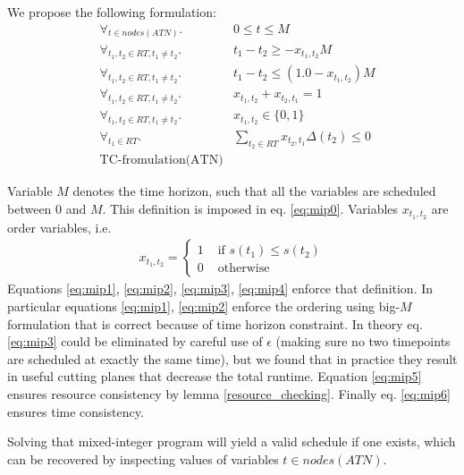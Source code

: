 \documentclass{article}
\begin{document}
\begin{multicols}{2}
We propose the following formulation:
\begin{align}
\label{eq:mip0} & \forall_{t \in nodes(ATN)}.              & 0 \leq t \leq M \\
\label{eq:mip1} & \forall_{t_1, t_2 \in RT, t_1 \neq t_2}. & t_1 - t_2 \geq - x_{t_1,t_2} M \\
\label{eq:mip2} & \forall_{t_1, t_2 \in RT, t_1 \neq t_2}. & t_1 - t_2 \leq (1.0 - x_{t_1,t_2}) M\\
\label{eq:mip3} & \forall_{t_1, t_2 \in RT, t_1 \neq t_2}. & x_{t_1,t_2} + x_{t_2,t_1}  = 1\\
\label{eq:mip4} & \forall_{t_1, t_2 \in RT, t_1 \neq t_2}. & x_{t_1,t_2} \in \{ 0, 1 \} \\
\label{eq:mip5} & \forall_{t_1 \in RT}.                    & \sum_{t_2 \in RT} x_{t_2, t_1} \Delta(t_2) \leq 0\\
\label{eq:mip6} & \text{TC-fromulation(ATN)}
\end{align}

Variable $M$ denotes the time horizon, such that all the variables are scheduled between $0$ and $M$. This definition is imposed in eq. \ref{eq:mip0}.
Variables $x_{t_1,t_2}$ are order variables, i.e.
\begin{align*}
x_{t_1, t_2} = \begin{cases}
1 &\text{ if }s(t_1) \leq s(t_2) \\
0 &\text{ otherwise}
\end{cases}
\end{align*}
Equations \ref{eq:mip1}, \ref{eq:mip2}, \ref{eq:mip3}, \ref{eq:mip4} enforce that definition. In particular equations \ref{eq:mip1}, \ref{eq:mip2} enforce the ordering using big-$M$ formulation that is correct because of time horizon constraint. In theory eq. \ref{eq:mip3} could be eliminated by careful use of $\epsilon$ (making sure no two timepoints are scheduled at exactly the same time), but we found that in practice they result in useful cutting planes that decrease the total runtime. Equation \ref{eq:mip5} ensures resource consistency by lemma \ref{resource_checking}. Finally eq. \ref{eq:mip6} ensures time consistency.

Solving that mixed-integer program will yield a valid schedule if one exists, which can be recovered by inspecting values of variables $t \in nodes(ATN)$.


\end{multicols}
\end{document}
